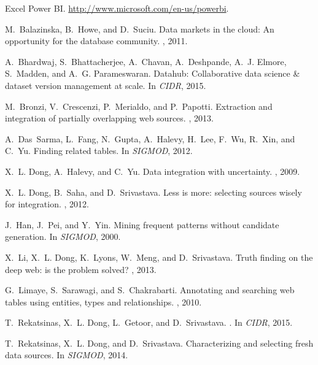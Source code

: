 \documentclass{vldb}
\begin{document}
{\scriptsize
\begin{thebibliography}{10}
Excel Power BI.
\newblock \url{http://www.microsoft.com/en-us/powerbi}.

M.~Balazinska, B.~Howe, and D.~Suciu.
\newblock Data markets in the cloud: An opportunity for the database community.
, 2011.

A.~Bhardwaj, S.~Bhattacherjee, A.~Chavan, A.~Deshpande, A.~J. Elmore,
  S.~Madden, and A.~G. Parameswaran.
\newblock Datahub: Collaborative data science \& dataset version management at
  scale.
\newblock In {\em CIDR}, 2015.

M.~Bronzi, V.~Crescenzi, P.~Merialdo, and P.~Papotti.
\newblock Extraction and integration of partially overlapping web sources.
, 2013.

A.~Das~Sarma, L.~Fang, N.~Gupta, A.~Halevy, H.~Lee, F.~Wu, R.~Xin, and C.~Yu.
\newblock Finding related tables.
\newblock In {\em SIGMOD}, 2012.

X.~L. Dong, A.~Halevy, and C.~Yu.
\newblock Data integration with uncertainty.
, 2009.

X.~L. Dong, B.~Saha, and D.~Srivastava.
\newblock Less is more: selecting sources wisely for integration.
, 2012.

J.~Han, J.~Pei, and Y.~Yin.
\newblock Mining frequent patterns without candidate generation.
\newblock In {\em SIGMOD}, 2000.

X.~Li, X.~L. Dong, K.~Lyons, W.~Meng, and D.~Srivastava.
\newblock Truth finding on the deep web: is the problem solved?
, 2013.

G.~Limaye, S.~Sarawagi, and S.~Chakrabarti.
\newblock Annotating and searching web tables using entities, types and
  relationships.
, 2010.

T.~Rekatsinas, X.~L. Dong, L.~Getoor, and D.~Srivastava.
.
\newblock In {\em CIDR}, 2015.

T.~Rekatsinas, X.~L. Dong, and D.~Srivastava.
\newblock Characterizing and selecting fresh data sources.
\newblock In {\em SIGMOD}, 2014.


\end{thebibliography}}
\end{document}
